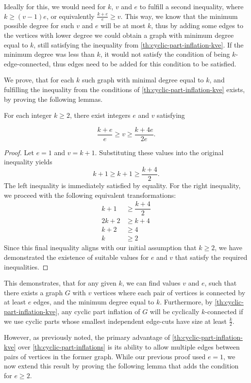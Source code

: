 \documentclass[12pt, twoside]{book}
\begin{document}
Ideally for this, we would need for $k$, $v$ and $e$ to fulfill a second inequality, where ${k\geq (v-1)e}$, or equivalently $\frac{k+e}{e}\geq v$. This way, we know that the minimum possible degree for such $v$ and $e$ will be at most $k$, thus by adding some edges to the vertices with lower degree we could obtain a graph with minimum degree equal to $k$, still satisfying the inequality from \cref{th:cyclic-part-inflation-kve}. If the minimum degree was less than $k$, it would not satisfy the condition of being $k$-edge-connected, thus edges need to be added for this condition to be satisfied.

We prove, that for each $k$ such graph with minimal degree equal to $k$, and fulfilling the inequality from the conditions of \cref{th:cyclic-part-inflation-kve} exists, by proving the following lemmas.

\begin{lemma}
	For each integer $k\geq 2$, there exist integers $e$ and $v$ satisfying
	
	$$\dfrac{k+e}{e}\geq v\geq \dfrac{k+4e}{2e}.$$
\end{lemma}

\begin{proof}
	Let $e=1$ and $v=k+1$. Substituting these values into the original inequality yields
	$$k+1\geq k+1\geq \dfrac{k+4}{2}.$$
	The left inequality is immediately satisfied by equality. For the right inequality, we proceed with the following equivalent transformations:
	\begin{align*}
		k+1&\geq \dfrac{k+4}{2} \\
		2k+2&\geq k+4 \\
		k+2&\geq 4 \\
		k&\geq 2
	\end{align*}
	Since this final inequality aligns with our initial assumption that $k\geq 2$, we have demonstrated the existence of suitable values for $e$ and $v$ that satisfy the required inequalities.
\end{proof}

This demonstrates, that for any given $k$, we can find values $v$ and $e$, such that there exists a graph $G$ with $v$ vertices where each pair of vertices is connected by at least $e$ edges, and the minimum degree equal to $k$. Furthermore, by \cref{th:cyclic-part-inflation-kve}, any cyclic part inflation of $G$ will be cyclically $k$-connected if we use cyclic parts whose smallest independent edge-cuts have size at least $\frac{k}{2}$.

However, as previously noted, the primary advantage of \cref{th:cyclic-part-inflation-kve} over \cref{th:cyclic-part-inflations} is its ability to allow multiple edges between pairs of vertices in the former graph. While our previous proof used $e=1$, we now extend this result by proving the following lemma that adds the condition for $e\geq 2$.
\end{document}
